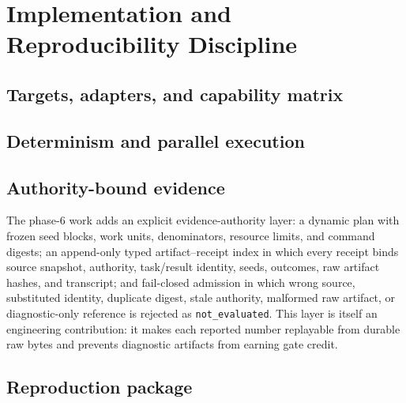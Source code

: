 \section{Implementation and Reproducibility Discipline}
\label{sec:implementation}

\subsection{Targets, adapters, and capability matrix}


\subsection{Determinism and parallel execution}


\subsection{Authority-bound evidence}
\label{sec:impl-authority}

The phase-6 work adds an explicit evidence-authority layer: a dynamic plan with frozen seed
blocks, work units, denominators, resource limits, and command digests; an append-only typed
artifact--receipt index in which every receipt binds source snapshot, authority, task/result
identity, seeds, outcomes, raw artifact hashes, and transcript; and fail-closed admission in
which wrong source, substituted identity, duplicate digest, stale authority, malformed raw
artifact, or diagnostic-only reference is rejected as \texttt{not\_evaluated}. This layer is
itself an engineering contribution: it makes each reported number replayable from durable raw
bytes and prevents diagnostic artifacts from earning gate credit. 

\subsection{Reproduction package}

